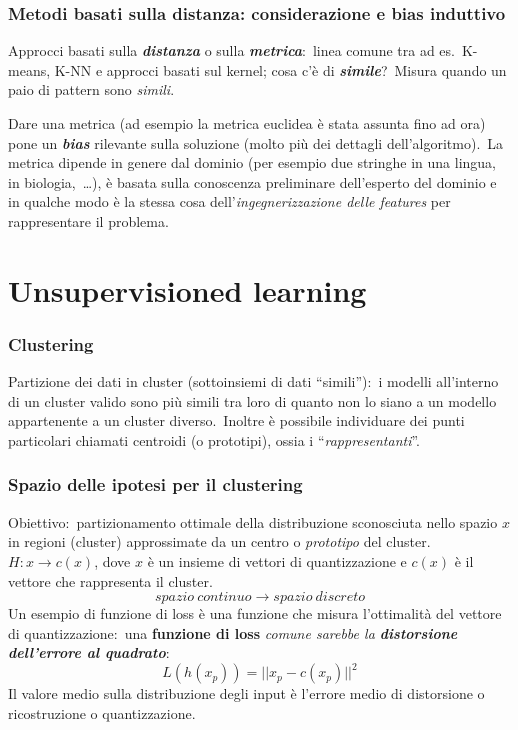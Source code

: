 \subsubsection{Metodi basati sulla distanza: considerazione e bias induttivo}

Approcci basati sulla \textbf{\textit{distanza}} o sulla \textbf{\textit{metrica}}:\ linea comune tra ad es.\ K-means, K-NN e approcci basati sul kernel; cosa c'è di \textbf{\textit{simile}}?\ Misura quando un paio di pattern sono \textit{simili}.\

Dare una metrica (ad esempio la metrica euclidea è stata assunta fino ad ora) pone un \textbf{\textit{bias}} rilevante sulla soluzione (molto più dei dettagli dell'algoritmo).\
La metrica dipende in genere dal dominio (per esempio due stringhe in una lingua, in biologia,\ \dots), è basata sulla conoscenza preliminare dell'esperto del dominio e in qualche modo è la stessa cosa dell'\textit{ingegnerizzazione delle features} per rappresentare il problema.

\section{Unsupervisioned learning}

\subsubsection{Clustering}

Partizione dei dati in cluster (sottoinsiemi di dati ``simili''):\ i modelli all'interno di un cluster valido sono più simili tra loro di quanto non lo siano a un modello appartenente a un cluster diverso.\
Inoltre è possibile individuare dei punti particolari chiamati centroidi (o prototipi), ossia i ``\textit{rappresentanti}''.

\subsubsection{Spazio delle ipotesi per il clustering}

Obiettivo:\ partizionamento ottimale della distribuzione sconosciuta nello spazio $x$ in regioni (cluster) approssimate da un centro o \textit{prototipo} del cluster.\
$H: x \rightarrow c(x)$, dove $x$ è un insieme di vettori di quantizzazione e $c(x)$ è il vettore che rappresenta il cluster.
\[\mathit{spazio\ continuo} \rightarrow \mathit{spazio\ discreto}\]
Un esempio di funzione di loss è una funzione che misura l'ottimalità del vettore di quantizzazione:\ una \textbf{funzione di loss} \textit{comune sarebbe la \textbf{distorsione dell'errore al quadrato}}:
\[ L(h(x_p)) = ||x_p - c(x_p)||^2\]
Il valore medio sulla distribuzione degli input è l'errore medio di distorsione o ricostruzione o quantizzazione.

